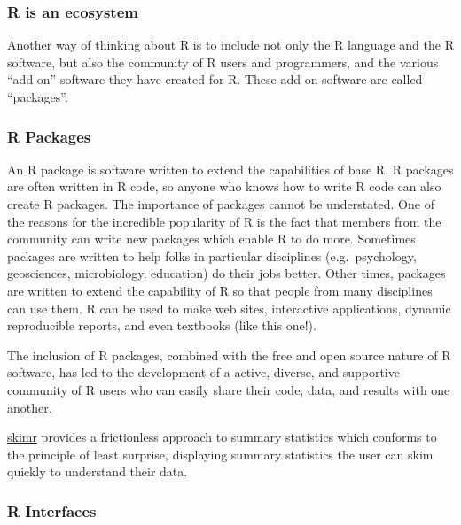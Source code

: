\documentclass[
]{article}
\newenvironment{bonus}{
  \specialblock{bonus}{sun-fill.png}{Bonus}
}{\endspecialblock}
\begin{document}
\hypertarget{r-is-an-ecosystem}{%
\subsubsection{R is an ecosystem}\label{r-is-an-ecosystem}}

Another way of thinking about R is to include not only the R language and the R software, but also the community of R users and programmers, and the various ``add on'' software they have created for R.
These add on software are called ``packages''.

\hypertarget{r-packages}{%
\subsubsection{R Packages}\label{r-packages}}

An R package is software written to extend the capabilities of base R.
R packages are often written in R code, so anyone who knows how to write R code can also create R packages.
The importance of packages cannot be understated.
One of the reasons for the incredible popularity of R is the fact that members from the community can write new packages which enable R to do more.
Sometimes packages are written to help folks in particular disciplines (e.g.~psychology, geosciences, microbiology, education) do their jobs better.
Other times, packages are written to extend the capability of R so that people from many disciplines can use them.
R can be used to make web sites, interactive applications, dynamic reproducible reports, and even textbooks (like this one!).

The inclusion of R packages, combined with the free and open source nature of R software, has led to the development of a active, diverse, and supportive community of R users who can easily share their code, data, and results with one another.

\begin{bonus}
\href{https://github.com/ropensci/skimr}{skimr} provides a frictionless
approach to summary statistics which conforms to the principle of least
surprise, displaying summary statistics the user can skim quickly to
understand their data.
\end{bonus}

\hypertarget{r-interfaces}{%
\subsubsection{R Interfaces}\label{r-interfaces}}
\end{document}
